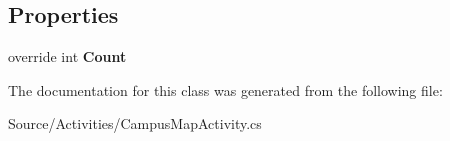\subsection*{Properties}
\begin{DoxyCompactItemize}
\item 
override int {\bfseries Count}\hypertarget{class_w_c_c_mobile_1_1_drawer_around_adapter_a1e79a8c77850ad4572f772e01b6d1fe9}{}\label{class_w_c_c_mobile_1_1_drawer_around_adapter_a1e79a8c77850ad4572f772e01b6d1fe9}

\end{DoxyCompactItemize}


The documentation for this class was generated from the following file\+:\begin{DoxyCompactItemize}
\item 
Source/\+Activities/Campus\+Map\+Activity.\+cs\end{DoxyCompactItemize}
